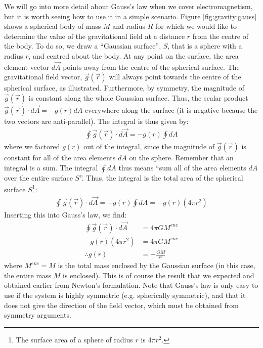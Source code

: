 We will go into more detail about Gauss's law when we cover electromagnetism, but it is worth seeing how to use it in a simple scenario. Figure \ref{fig:gravity:gauss} shows a spherical body of mass $M$ and radius $R$ for which we would like to determine the value of the gravitational field at a distance $r$ from the centre of the body.
To do so, we draw a ``Gaussian surface'', $S$, that is a sphere with a radius $r$, and centred about the body. At any point on the surface, the area element vector $d\vec A$ points away from the centre of the spherical surface. The gravitational field vector, $\vec g(\vec r)$ will always point towards the centre of the spherical surface, as illustrated. Furthermore, by symmetry, the magnitude of $\vec g(\vec r)$ is constant along the whole Gaussian surface. Thus, the scalar product $\vec g(\vec r) \cdot d\vec A=-g(r)dA$ everywhere along the surface (it is negative because the two vectors are anti-parallel). The integral is thus given by:
\begin{align*}
\oint \vec g(\vec r) \cdot d\vec A = -g(r)\oint dA 
\end{align*}
where we factored $g(r)$ out of the integral, since the magnitude of $\vec g(\vec r)$ is constant for all of the area elements $dA$ on the sphere. Remember that an integral is a sum. The integral $\oint dA$ thus means ``sum all of the area elements $dA$ over the entire surface $S$''. Thus, the integral is the total area of the spherical surface $S$\footnote{The surface area of a sphere of radius $r$ is $4\pi r^2$.}:
\begin{align*}
\oint \vec g(\vec r) \cdot d\vec A = -g(r)\oint dA =-g(r)(4\pi r^2)
\end{align*}
Inserting this into Gauss's law, we find:
\begin{align*}
\oint \vec g(\vec r) \cdot d\vec A &= 4\pi G M^{enc}\\
-g(r)(4\pi r^2) &= 4\pi G M^{enc}\\
\therefore g(r) &= - \frac{GM}{r^2}
\end{align*}
where $M^{enc}=M$ is the total mass enclosed by the Gaussian surface (in this case, the entire mass $M$ is enclosed). This is of course the result that we expected and obtained earlier from Newton's formulation. Note that Gauss's law is only easy to use if the system is highly symmetric (e.g. spherically symmetric), and that it does not give the direction of the field vector, which must be obtained from symmetry arguments. 
